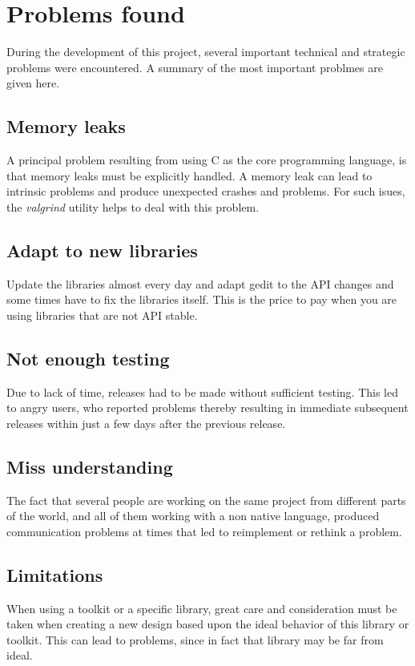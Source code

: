 \chapter{Problems found}

During the development of this project, several important technical and strategic problems were encountered. A summary of 
the most important problmes are given here. 

\section*{Memory leaks}

A principal problem resulting from using C as the core programming language, is that memory leaks must be explicitly handled. 
A memory leak can lead to intrinsic problems and produce unexpected crashes and problems. For such isues, the 
\emph{valgrind} utility helps to deal with this problem.

\section*{Adapt to new libraries}

Update the libraries almost every day and adapt gedit to the API changes and some times have to fix the libraries itself. This is the price to pay when you are using libraries that are not API stable.

\section*{Not enough testing}

Due to lack of time, releases had to be made without sufficient testing. This led to angry users, who reported problems thereby resulting 
in immediate subsequent releases within just a few days after the previous release.

\section*{Miss understanding}

The fact that several people are working on the same project from different parts of the world, and all of them working with a non 
native language, produced communication problems at times that led to reimplement or rethink a problem.

\section*{Limitations}

When using a toolkit or a specific library, great care and consideration must be taken when creating a new design 
based upon the ideal behavior of this library or toolkit.    This can lead to problems, since in fact that library 
may be far from ideal.
